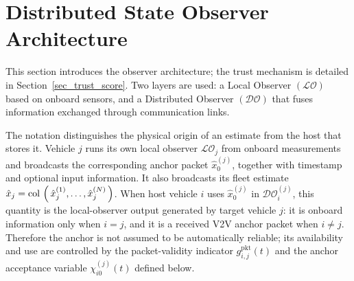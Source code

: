 \documentclass[letterpaper,journal]{IEEEtran}
\def\col#1{\mathop{{\rm col}\,\left(\,#1\,\right)}}
\def\LO{\mathcal{LO}} %
\def\DO{\mathcal{DO}} %
\begin{document}
\section{Distributed State Observer Architecture}\label{sec_distributed_observer}
This section introduces the observer architecture; the trust mechanism is detailed in Section~\ref{sec_trust_score}. Two layers are used: a Local Observer $(\LO)$ based on onboard sensors, and a Distributed Observer $(\DO)$ that fuses information exchanged through communication links.

The notation distinguishes the physical origin of an estimate from the host that stores it. Vehicle $j$ runs its own local observer $\LO_j$ from onboard measurements and broadcasts the corresponding anchor packet $\hat{x}_0^{(j)}$, together with timestamp and optional input information. It also broadcasts its fleet estimate $\hat{x}_j=\col{\hat{x}_j^{(1)},\ldots,\hat{x}_j^{(N)}}$. When host vehicle $i$ uses $\hat{x}_0^{(j)}$ in $\DO_i^{(j)}$, this quantity is the local-observer output generated by target vehicle $j$: it is onboard information only when $i=j$, and it is a received V2V anchor packet when $i\neq j$. Therefore the anchor is not assumed to be automatically reliable; its availability and use are controlled by the packet-validity indicator $g_{i,j}^{\mathrm{pkt}}(t)$ and the anchor acceptance variable $\chi_{i0}^{(j)}(t)$ defined below.
\end{document}
